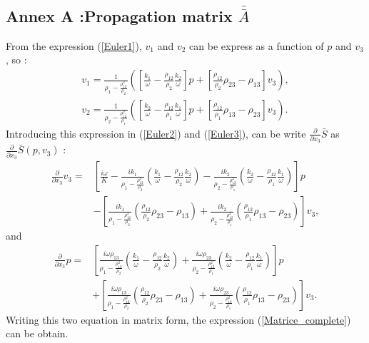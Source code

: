 \documentclass{article}
\begin{document}
\subsection*{Annex A :Propagation matrix $\bar{\bar{A}}$}
\label{Ann_A}	
From the expression (\ref{Euler1}), $v_1$ and $v_2$ can be express as a function of $p$ and $v_3$, so :
\begin{align*}
	v_1=\frac{1}{\rho_1-\frac{\rho_{12}^2}{\rho_2}}([\frac{k_1}{\omega}-\frac{\rho_{12}}{\rho_2}\frac{k_2}{\omega}]p+[\frac{\rho_{12}}{\rho_2}\rho_{23}-\rho_{13}]v_3), \\
	v_2=\frac{1}{\rho_2-\frac{\rho_{12}^2}{\rho_1}}([\frac{k_2}{\omega}-\frac{\rho_{12}}{\rho_1}\frac{k_1}{\omega}]p+[\frac{\rho_{12}}{\rho_1}\rho_{13}-\rho_{23}]v_3).
\end{align*}
 	Introducing this expression in (\ref{Euler2}) and (\ref{Euler3}), can be write $\frac{\partial}{\partial x_3}\bar{S}$ as $\frac{\partial}{\partial x_3}\bar{S}(p,v_3)$ :
    \begin{align*}
    \frac{\partial}{\partial x_3}v_3=&[\frac{i\omega}{K}-\frac{ik_1}{\rho_1-\frac{\rho_{12}^2}{\rho_2}}(\frac{k_1}{\omega}-\frac{\rho_{12}}{\rho_2}\frac{k_2}{\omega})-\frac{ik_2}{\rho_2-\frac{\rho_{12}^2}{\rho_1}}(\frac{k_2}{\omega}-\frac{\rho_{12}}{\rho_1}\frac{k_1}{\omega})]p\\
    &-[\frac{ik_1}{\rho_1-\frac{\rho_{12}^2}{\rho_2}}(\frac{\rho_{12}}{\rho_2}\rho_{23}-\rho_{13})+\frac{ik_2}{\rho_2-\frac{\rho_{12}^2}{\rho_1}}(\frac{\rho_{12}}{\rho_1}\rho_{13}-\rho_{23})]v_3,
    \end{align*}
    and 
    \begin{align*}
    \frac{\partial}{\partial x_3}p=&[\frac{i\omega \rho_{13}}{\rho_1-\frac{\rho_{12}^2}{\rho_2}}(\frac{k_1}{\omega}-\frac{\rho_{12}}{\rho_2}\frac{k_2}{\omega})+\frac{i\omega \rho_{23}}{\rho_2-\frac{\rho_{12}^2}{\rho_1}}(\frac{k_2}{\omega}-\frac{\rho_{12}}{\rho_1}\frac{k_1}{\omega})]p\\
    &+[\frac{i\omega \rho_{13}}{\rho_1-\frac{\rho_{12}^2}{\rho_2}}(\frac{\rho_{12}}{\rho_2}\rho_{23}-\rho_{13})+\frac{i\omega \rho_{23}}{\rho_2-\frac{\rho_{12}^2}{\rho_1}}(\frac{\rho_{12}}{\rho_1}\rho_{13}-\rho_{23})]v_3.
    \end{align*}
    Writing this two equation in matrix form, the expression (\ref{Matrice_complete}) can be obtain.
    
\end{document}
